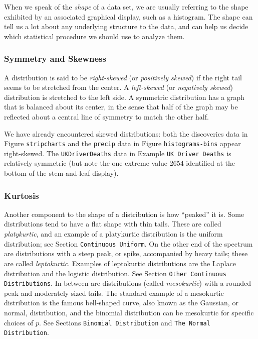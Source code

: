 \documentclass[10pt,english]{scrbook}
\begin{document}
When we speak of the \emph{shape} of a data set, we are usually referring to the shape exhibited by an associated graphical display, such as a histogram. The shape can tell us a lot about any underlying structure to the data, and can help us decide which statistical procedure we should use to analyze them.

\subsubsection[Symmetry and Skewness]{Symmetry and Skewness}
\label{sec-1-2-3-1}

A distribution is said to be \emph{right-skewed} (or \emph{positively skewed}) if the right tail seems to be stretched from the center. A \emph{left-skewed} (or \emph{negatively skewed}) distribution is stretched to the left side. A symmetric distribution has a graph that is balanced about its center, in the sense that half of the graph may be reflected about a central line of symmetry to match the other
half.

We have already encountered skewed distributions: both the discoveries data in Figure \texttt{stripcharts} and the \texttt{precip} data in Figure \texttt{histograms-bins} appear right-skewed. The \texttt{UKDriverDeaths} data in Example \texttt{UK Driver Deaths} is relatively symmetric (but note the one extreme value 2654 identified at the bottom of the stem-and-leaf display).
\subsubsection[Kurtosis]{Kurtosis}
\label{sec-1-2-3-2}

Another component to the shape of a distribution is how ``peaked'' it is. Some distributions tend to have a flat shape with thin tails. These are called \emph{platykurtic}, and an example of a platykurtic distribution is the uniform distribution; see Section \texttt{Continuous Uniform}. On the other end of the spectrum are distributions with a steep peak, or spike, accompanied by heavy tails; these are called \emph{leptokurtic}. Examples of leptokurtic distributions are the Laplace distribution and the logistic distribution. See Section \texttt{Other Continuous Distributions}. In between are distributions (called \emph{mesokurtic}) with a rounded peak and moderately sized tails. The standard example of a mesokurtic distribution is the famous bell-shaped curve, also known as the Gaussian, or normal, distribution, and the binomial distribution can be mesokurtic for specific choices of \(p\). See Sections \texttt{Binomial Distribution} and \texttt{The Normal Distribution}.
\end{document}
